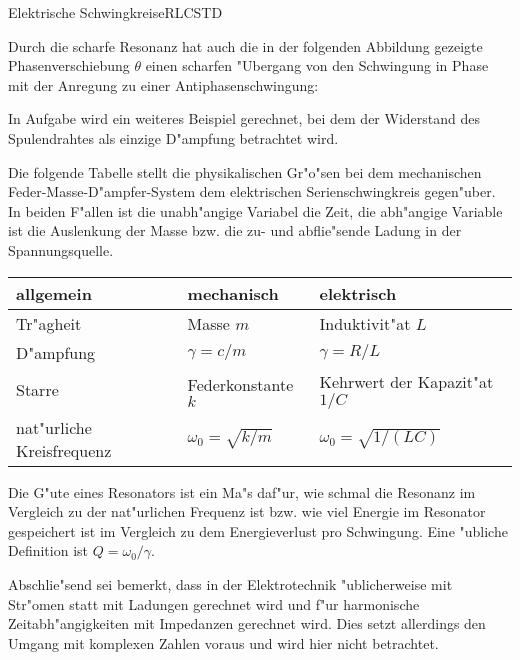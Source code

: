\begin{MXContent}{Elektrische Schwingkreise}{RLC}{STD}
\begin{MExample}
Durch die scharfe Resonanz hat auch die in der folgenden Abbildung gezeigte Phasenverschiebung $\theta$ einen scharfen "Ubergang von den Schwingung in Phase mit der Anregung zu einer Antiphasenschwingung:

\begin{center}
  \end{center}

\end{MExample}

In Aufgabe
wird ein weiteres Beispiel gerechnet, bei dem der Widerstand des Spulendrahtes als einzige D"ampfung betrachtet wird.

Die folgende Tabelle stellt die physikalischen Gr"o"sen bei dem mechanischen Feder-Masse-D"ampfer-System dem elektrischen Serienschwingkreis gegen"uber. In beiden F"allen ist die unabh"angige Variabel die Zeit, die abh"angige Variable ist die Auslenkung der Masse bzw. die zu- und abflie"sende Ladung in der Spannungsquelle.

\begin{tabular}{|l|l|l|}
\hline
  allgemein                & mechanisch            & elektrisch                   \\\hline
  Tr"agheit                 & Masse $m$             & Induktivit"at $L$             \\\hline
  D"ampfung                 & $\gamma=c/m$          & $\gamma=R/L$                 \\\hline
  Starre                   & Federkonstante $k$    & Kehrwert der Kapazit"at $1/C$ \\\hline
  nat"urliche Kreisfrequenz & $\omega_0=\sqrt{k/m}$ & $\omega_0=\sqrt{1/(L C)}$    \\\hline
\end{tabular}

Die G"ute eines Resonators ist ein Ma"s daf"ur, wie schmal die Resonanz im Vergleich zu der nat"urlichen Frequenz ist bzw. wie viel Energie im Resonator gespeichert ist im Vergleich zu dem Energieverlust pro Schwingung. Eine "ubliche Definition ist $Q=\omega_0/\gamma$.

Abschlie"send sei bemerkt, dass in der Elektrotechnik "ublicherweise mit Str"omen statt mit Ladungen gerechnet wird und f"ur harmonische Zeitabh"angigkeiten mit Impedanzen gerechnet wird. Dies setzt allerdings den Umgang mit komplexen Zahlen voraus und wird hier nicht betrachtet.

\end{MXContent}


